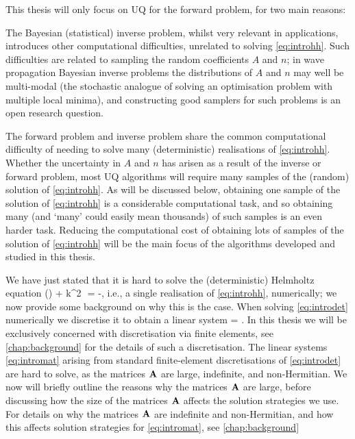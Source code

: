 This thesis will only focus on UQ for the forward problem, for two main reasons:
\ben
\item The Bayesian (statistical) inverse problem, whilst very relevant in applications, introduces other computational difficulties, unrelated to solving \eqref{eq:introhh}. Such difficulties are related to sampling the random coefficients $A$ and $n$; in wave propagation Bayesian inverse problems the distributions of $A$ and $n$ may well be multi-modal (the stochastic analogue of solving an optimisation problem with multiple local minima), and constructing good samplers for such problems is an open research question.
\item The forward problem and inverse problem share the common computational difficulty of needing to solve many (deterministic) realisations of \eqref{eq:introhh}. Whether the uncertainty in $A$ and $n$ has arisen as a result of the inverse or forward problem, most UQ algorithms will require many samples of the (random) solution of \eqref{eq:introhh}. As will be discussed below, obtaining one sample of the solution of \eqref{eq:introhh} is a considerable computational task, and so obtaining many (and `many' could easily mean thousands) of such samples is an even harder task. Reducing the computational cost of obtaining lots of samples of the solution of \eqref{eq:introhh} will be the main focus of the algorithms developed and studied in this thesis.
\een

We have just stated that it is hard to solve the (deterministic) Helmholtz equation
\beq\label{eq:introdet}
\grad \cdot (\Ad \grad \ud) + k^2 \,\nd\,\ud = -\fd,
\eeq
i.e., a single realisation of \eqref{eq:introhh}, numerically; we now provide some background on why this is the case. When solving \eqref{eq:introdet} numerically we discretise it to obtain a linear system
\beq\label{eq:intromat}
\Amat \bu = \bff.
\eeq
In this thesis we will be exclusively concerned with discretisation via finite elements, see \cref{chap:background} for the details of such a discretisation. The linear systems \eqref{eq:intromat} arising from standard finite-element discretisations of \eqref{eq:introdet} are hard to solve, as the matrices $\mathbf{A}$ are large, indefinite, and non-Hermitian. We now will briefly outline the reasons why the matrices $\mathbf{A}$ are large, before discussing how the size of the matrices $\mathbf{A}$ affects the solution strategies we use. For details on why the matrices $\mathbf{A}$ are indefinite and non-Hermitian, and how this affects solution strategies for \eqref{eq:intromat}, see \cref{chap:background}

